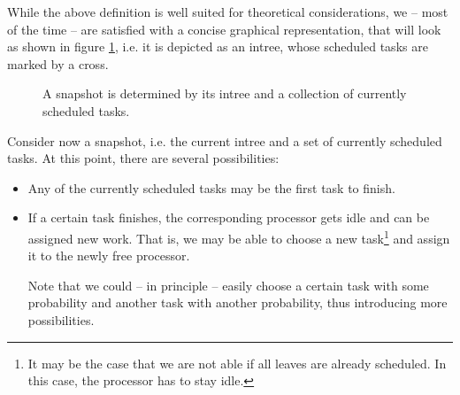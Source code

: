 While the above definition is well suited for theoretical considerations, we -- most of the time -- are satisfied with a concise graphical representation, that will look as shown in figure \ref{fig:intro-snapshot-graphical-representation}, i.e. it is depicted as an intree, whose scheduled tasks are marked by a cross.

\begin{figure}[t]
  \centering
  \caption{A snapshot is determined by its intree and a collection of currently scheduled tasks.}
  \label{fig:intro-snapshot-graphical-representation}
\end{figure}

Consider now a snapshot, i.e. the current intree and a set of currently scheduled tasks. At this point, there are several possibilities:

\begin{itemize}
\item Any of the currently scheduled tasks may be the first task to finish.
\item If a certain task finishes, the corresponding processor gets idle and can be assigned new work. That is, we may be able to choose a new task\footnote{It may be the case that we are not able if all leaves are already scheduled. In this case, the processor has to stay idle.} and assign it to the newly free processor.

  Note that we could -- in principle -- easily choose a certain task with some probability and another task with another probability, thus introducing more possibilities.
\end{itemize}

